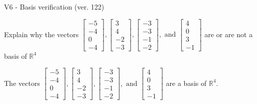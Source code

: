 \begin{exercise}
  \begin{exerciseTitle}V6 - Basis verification (ver. 122)\end{exerciseTitle}
  \begin{exerciseStatement}
    Explain why the vectors \(\left[\begin{array}{r}
-5 \\
-4 \\
0 \\
-4
\end{array}\right] , \left[\begin{array}{r}
3 \\
4 \\
-2 \\
-3
\end{array}\right] , \left[\begin{array}{r}
-3 \\
-3 \\
-1 \\
-2
\end{array}\right] , \text{ and } \left[\begin{array}{r}
4 \\
0 \\
3 \\
-1
\end{array}\right]\) are or are not a basis of \(\mathbb{R}^4\)	


  \end{exerciseStatement}
  \begin{exerciseAnswer}
   The vectors \(\left[\begin{array}{r}
-5 \\
-4 \\
0 \\
-4
\end{array}\right] , \left[\begin{array}{r}
3 \\
4 \\
-2 \\
-3
\end{array}\right] , \left[\begin{array}{r}
-3 \\
-3 \\
-1 \\
-2
\end{array}\right] , \text{ and } \left[\begin{array}{r}
4 \\
0 \\
3 \\
-1
\end{array}\right]\) 
  	 are  a basis of \(\mathbb{R}^4\).
  


  \end{exerciseAnswer}
\end{exercise}